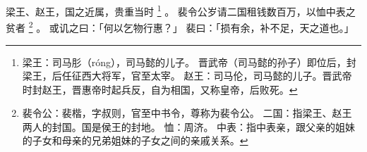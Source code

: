 
\switchcolumn*[\section{}]

梁王、赵王，国之近属，贵重当时%
\footnote{%
    梁王：司马肜（róng），司马懿的儿子。
          晋武帝（司马懿的孙子）即位后，封梁王，后任征西大将军，官至太宰。
    赵王：司马伦，司马懿的儿子。晋武帝时封赵王，晋惠帝时起兵反，自为相国，又称皇帝，后败死。
}%
。
裴令公岁请二国租钱数百万，以恤中表之贫者%
\footnote{%
    裴令公：裴楷，字叔则，官至中书令，尊称为裴令公。
    二国：指梁王、赵王两人的封国。国是侯王的封地。
    恤：周济。
    中表：指中表亲，跟父亲的姐妹的子女和母亲的兄弟姐妹的子女之间的亲戚关系。
}%
。
或讥之曰：「何以乞物行惠？」
裴曰：「损有余，补不足，天之道也。」

\switchcolumn



